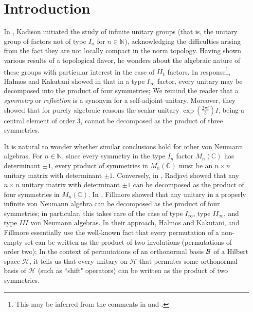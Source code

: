 \documentclass[12pt, preprint]{amsart}
\newcommand{\C}{\mathbb{C}}
\newcommand{\N}{\mathbb{N}}
\theoremstyle{definition}
\theoremstyle{remark}
\numberwithin{equation}{section}
\theoremstyle{ser}
\theoremstyle{serr}
\theoremstyle{ser}
\begin{document}



\maketitle 





\section{Introduction}

In \cite{kadison-unitary}, Kadison initiated the study of infinite unitary groups (that is, the unitary group of factors not of type $I_n$ for $n \in \N$), acknowledging the difficulties arising from the fact they are not locally compact in the norm topology. Having shown various results of a topological flavor, he wonders about the algebraic nature of these groups with particular interest in the case of $II_1$ factors.  In response\footnote{This may be inferred from the comments in \cite[pg. 399]{kadison-unitary} and \cite{halmos-kakutani}.}, Halmos and Kakutani showed in \cite{halmos-kakutani} that in a type $I_{\infty}$ factor, every unitary may be decomposed into the product of four symmetries; We remind the reader that a {\it symmetry} or {\it reflection} is a synonym for a self-adjoint unitary. Moreover, they showed that for purely algebraic reasons the scalar unitary $\exp(\frac{2 \pi i}{3})I$, being a central element of order $3$, cannot be decomposed as the product of three symmetries. 


It is natural to wonder whether similar conclusions hold for other von Neumann algebras. For $n \in \N$, since every symmetry in the type $I_n$ factor $M_n(\C)$ has determinant $\pm 1$, every product of symmetries in $M_n(\C)$ must be an $n \times n$ unitary matrix with determinant $\pm 1$. Conversely, in \cite[Theorem 3]{radjavi}, Radjavi showed that any $n  \times n$ unitary matrix with determinant $\pm 1$ can be decomposed as the product of four symmetries in $M_n(\C)$. In \cite{fillmore}, Fillmore showed that any unitary in a properly infinite von Neumann algebra can be decomposed as the product of four symmetries; in particular, this takes care of the case of type $I_{\infty}$, type $II_{\infty}$, and type $III$ von Neumann algebras. In their approach, Halmos and Kakutani, and Fillmore essentially use the well-known fact that every permutation of a non-empty set can be written as the product of two involutions (permutations of order two); In the context of permutations of an orthonormal basis $\mathcal B$ of a Hilbert space $\mathscr{H}$, it tells us that every unitary on $\mathscr{H}$ that permutes some orthonormal basis of $\mathscr{H}$ (such as ``shift" operators) can be written as the product of two symmetries.  
\end{document}
